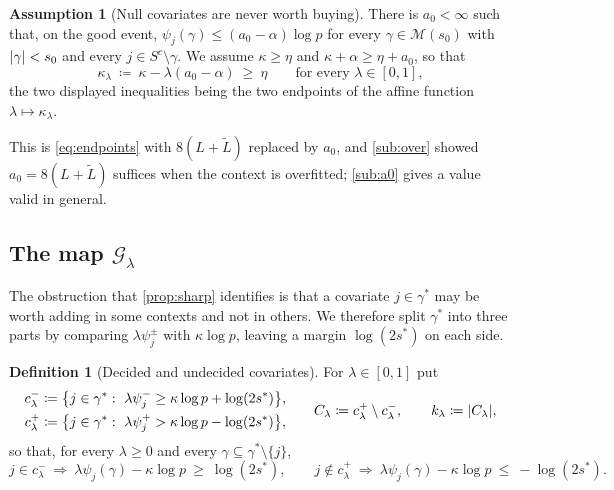 \documentclass[aos]{imsart}
\DeclarePairedDelimiter{\abs}{\lvert}{\rvert}
\newcommand{\Ltil}{\widetilde{L}}
\theoremstyle{plain}
\theoremstyle{definition}
\newtheorem{definition}{Definition}[section]
\newtheorem{assumption}{Assumption}[section]
\begin{document}
    \begin{assumption}[Null covariates are never worth buying]
        \label{ass:null}
        There is $a_0<\infty$ such that, on the good event,
        $\psi_j(\gamma)\leq(a_0-\alpha)\log p$ for every
        $\gamma\in\mathscr{M}(s_0)$ with $\abs\gamma<s_0$ and every
        $j\in S^{c}\setminus\gamma$. We assume $\kappa\geq\eta$ and
        $\kappa+\alpha\geq\eta+a_0$, so that
        \begin{equation}
            \label{eq:kappalam}
            \kappa_\lambda\ \coloneq\ \kappa-\lambda(a_0-\alpha)
            \ \geq\ \eta
            \qquad\text{for every }\lambda\in[0,1],
        \end{equation}
        the two displayed inequalities being the two endpoints of the affine
        function $\lambda\mapsto\kappa_\lambda$.
    \end{assumption}

    This is \eqref{eq:endpoints} with $8(L+\Ltil)$ replaced by $a_0$, and
    \cref{sub:over} showed $a_0=8(L+\Ltil)$ suffices when the context is
    overfitted; \cref{sub:a0} gives a value valid in general.

    \subsection{The map $\mathcal{G}_\lambda$}
    \label{sub:Glambda}

    The obstruction that \cref{prop:sharp} identifies is that a covariate
    $j\in\gamma^{\ast}$ may be worth adding in some contexts and not in
    others. We therefore split $\gamma^{\ast}$ into three parts by comparing
    $\lambda\psi_j^{\pm}$ with $\kappa\log p$, leaving a margin
    $\log(2s^{\ast})$ on each side.

    \begin{definition}[Decided and undecided covariates]
        \label{def:cpm}
        For $\lambda \in [0, 1]$ put
        \begin{equation}
            \label{eq:cpm}
            \begin{aligned}
                c^{-}_\lambda&\coloneq\bigl\{j\in\gamma^{\ast}:\
                \lambda\psi_j^{-}\geq\kappa\log p+\log(2s^{\ast})\bigr\},\\
                c^{+}_\lambda&\coloneq\bigl\{j\in\gamma^{\ast}:\
                \lambda\psi_j^{+}>\kappa\log p-\log(2s^{\ast})\bigr\},
            \end{aligned}
            \qquad
            C_\lambda\coloneq c^{+}_\lambda\setminus c^{-}_\lambda,
            \qquad
            k_\lambda\coloneq\abs{C_\lambda},
        \end{equation}
        so that, for every $\lambda\geq0$ and every
        $\gamma\subseteq\gamma^{\ast}\setminus\{j\}$,
        \begin{equation}
            \label{eq:cpmuse}
            j\in c^{-}_\lambda\ \Longrightarrow\ \lambda\psi_j(\gamma)
            -\kappa\log p\ \geq\ \log(2s^{\ast}),
            \qquad
            j\notin c^{+}_\lambda\ \Longrightarrow\ \lambda\psi_j(\gamma)
            -\kappa\log p\ \leq\ -\log(2s^{\ast}) .
        \end{equation}
    \end{definition}
\end{document}
